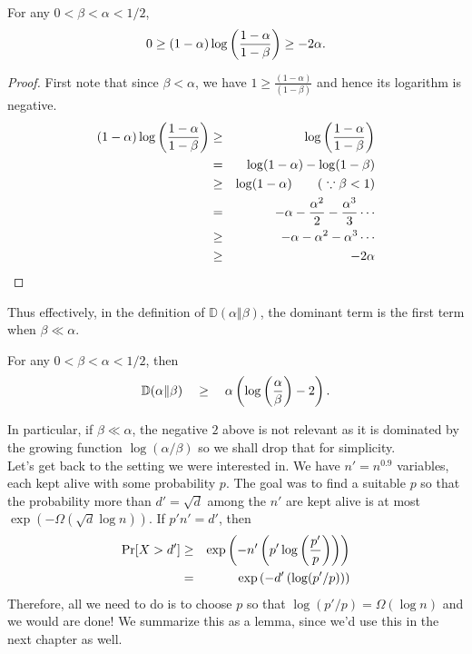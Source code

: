 \begin{claim}\label{stronger-chernoff-secondterm}
For any $0 < \beta < \alpha < 1/2$, 
\[
0 \geq (1 - \alpha) \log\left(\frac{1 - \alpha}{1 - \beta}\right) \geq -2\alpha. 
\]
\end{claim}
\begin{proof}
First note that since $\beta < \alpha$, we have $1 \geq \frac{(1-\alpha)}{(1-\beta)}$ and hence its logarithm is negative. 
\begin{eqnarray*}
(1 - \alpha) \log\left(\frac{1 - \alpha}{1 - \beta}\right) & \geq & \log\left(\frac{1 - \alpha}{1 - \beta}\right)\\
& = & \log(1 - \alpha) - \log (1-\beta)\\
& \geq & \log(1 - \alpha)\qquad(\text{ $\because \beta < 1$})\\
& = & - \alpha - \frac{\alpha^2}{2} - \frac{\alpha^3}{3} \cdots \\
& \geq & - \alpha - \alpha^2 - \alpha^3 \cdots\\
& \geq & -2\alpha\qedhere
\end{eqnarray*}
\end{proof}
Thus effectively, in the definition of $\mathbb{D}(\alpha \Vert \beta)$, the dominant term is the first term when $\beta \ll \alpha$. 

\begin{corollary}
For any $0 < \beta < \alpha < 1/2$, then
\[
\mathbb{D}(\alpha\Vert \beta)  \quad \geq \quad  \alpha \left(\log\left(\frac{\alpha}{\beta}\right) - 2\right).
\]
\end{corollary}

\noindent In particular, if $\beta \ll \alpha$, the negative $2$ above is not relevant as it is dominated by the growing function $\log(\alpha/\beta)$ so we shall drop that for simplicity.\\

Let's get back to the setting we were interested in.
We have $n' = n^{0.9}$ variables, each kept alive with some probability $p$.
The goal was to find a suitable $p$ so that the probability more than $d' = \sqrt{d}$ among the $n'$ are kept alive is at most $\exp(-\Omega(\sqrt{d} \log n))$. If $p'n' =  d'$, then
\begin{eqnarray*}
\Pr[X > d'] & \geq & \exp\left(-n' \left(p'\log\left(\frac{p'}{p}\right)\right)\right)\\
 & = & \exp\left(-d'\left(\log(p'/p)\right)\right)
\end{eqnarray*}
Therefore, all we need to do is to choose $p$ so that $\log(p'/p) = \Omega(\log n)$ and we would are done!
We summarize this as a lemma, since we'd use this in the next chapter as well.

